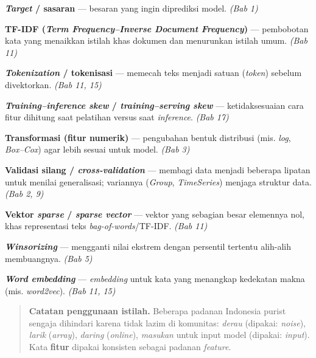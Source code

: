 \textbf{\emph{Target} / sasaran} --- besaran yang ingin diprediksi model. \emph{(Bab 1)}

\textbf{TF-IDF (\emph{Term Frequency--Inverse Document Frequency})} --- pembobotan kata yang
menaikkan istilah khas dokumen dan menurunkan istilah umum. \emph{(Bab 11)}

\textbf{\emph{Tokenization} / tokenisasi} --- memecah teks menjadi satuan (\emph{token}) sebelum
divektorkan. \emph{(Bab 11, 15)}

\textbf{\emph{Training--inference skew} / \emph{training--serving skew}} --- ketidaksesuaian cara
fitur dihitung saat pelatihan versus saat \emph{inference}. \emph{(Bab 17)}

\textbf{Transformasi (fitur numerik)} --- pengubahan bentuk distribusi (mis. \emph{log},
\emph{Box--Cox}) agar lebih sesuai untuk model. \emph{(Bab 3)}


\textbf{Validasi silang / \emph{cross-validation}} --- membagi data menjadi beberapa lipatan
untuk menilai generalisasi; variannya (\emph{Group}, \emph{TimeSeries}) menjaga struktur
data. \emph{(Bab 2, 9)}

\textbf{Vektor \emph{sparse} / \emph{sparse vector}} --- vektor yang sebagian besar elemennya nol,
khas representasi teks \emph{bag-of-words}/TF-IDF. \emph{(Bab 11)}


\textbf{\emph{Winsorizing}} --- mengganti nilai ekstrem dengan persentil tertentu alih-alih
membuangnya. \emph{(Bab 5)}

\textbf{\emph{Word embedding}} --- \emph{embedding} untuk kata yang menangkap kedekatan makna
(mis. \emph{word2vec}). \emph{(Bab 11, 15)}

\begin{quote}
\textbf{Catatan penggunaan istilah.} Beberapa padanan Indonesia purist sengaja
dihindari karena tidak lazim di komunitas: \emph{derau} (dipakai: \emph{noise}), \emph{larik}
(\emph{array}), \emph{daring} (\emph{online}), \emph{masukan} untuk input model (dipakai: \emph{input}).
Kata \textbf{fitur} dipakai konsisten sebagai padanan \emph{feature}.
\end{quote}
